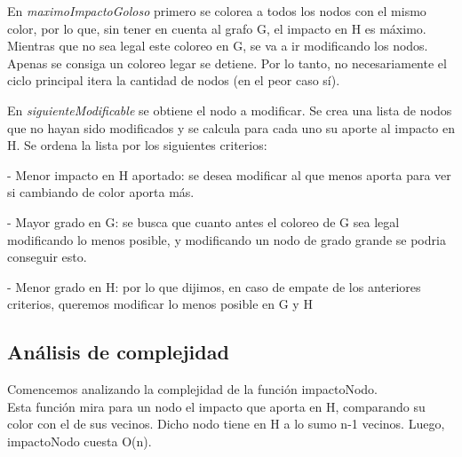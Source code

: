 \quad

\quad En \textit{maximoImpactoGoloso} primero se colorea a todos los nodos con el mismo color, por lo que, sin tener en cuenta al grafo G, el impacto en H es máximo. Mientras que no sea legal este coloreo en G, se va a ir modificando los nodos. Apenas se consiga un coloreo legar se detiene. Por lo tanto, no necesariamente el ciclo principal itera la cantidad de nodos (en el peor caso sí).

\quad En \textit{siguienteModificable} se obtiene el nodo a modificar. Se crea una lista de nodos que no hayan sido modificados y se calcula para cada uno su aporte al impacto en H. Se ordena la lista por los siguientes criterios:

\quad

\quad \quad - Menor impacto en H aportado: se desea modificar al que menos aporta para ver si cambiando de color aporta más.

\quad

\quad \quad - Mayor grado en G: se busca que cuanto antes el coloreo de G sea legal modificando lo menos posible, y modificando un nodo de grado grande se podria conseguir esto.

\quad 

\quad \quad - Menor grado en H: por lo que dijimos, en caso de empate de los anteriores criterios, queremos modificar lo menos posible en G y H


\subsection{Análisis de complejidad}

\indent Comencemos analizando la complejidad de la función impactoNodo.\\
\indent Esta función mira para un nodo el impacto que aporta en H, comparando su color con el de sus vecinos. Dicho nodo tiene en H a lo sumo n-1 vecinos. Luego, impactoNodo cuesta O(n).

